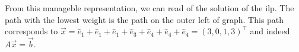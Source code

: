From this manageble representation, we can read of the solution of the ilp. The path with the lowest weight is the path on the outer left of graph. This path corresponds to $\vec x = \hat e_1 + \hat e_1 + \hat e_1 + \hat e_3 + \hat e_4 + \hat e_4 + \hat e_4 = (3, 0, 1, 3)^\top$ and indeed $A\vec x = \vec b$. 



